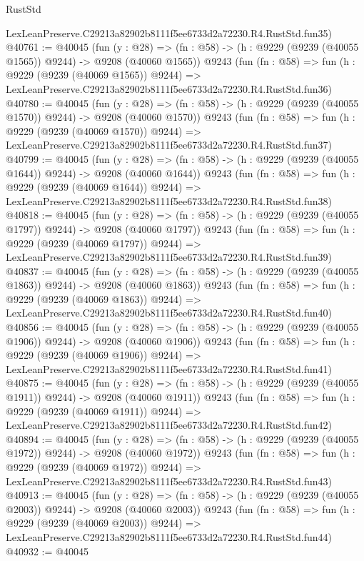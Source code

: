 \begin{lexlean}{RustStd}
\begin{coremodule}
    LexLeanPreserve.C29213a82902b8111f5ee6733d2a72230.R4.RustStd.fun35)
@40761 := @40045
    (fun (y : @28) =>
    (fn : @58) -> (h : @9229 (@9239 (@40055 @1565)) @9244) -> @9208 (@40060 @1565))
    @9243
    (fun (fn : @58) =>
    fun (h : @9229 (@9239 (@40069 @1565)) @9244) =>
    LexLeanPreserve.C29213a82902b8111f5ee6733d2a72230.R4.RustStd.fun36)
@40780 := @40045
    (fun (y : @28) =>
    (fn : @58) -> (h : @9229 (@9239 (@40055 @1570)) @9244) -> @9208 (@40060 @1570))
    @9243
    (fun (fn : @58) =>
    fun (h : @9229 (@9239 (@40069 @1570)) @9244) =>
    LexLeanPreserve.C29213a82902b8111f5ee6733d2a72230.R4.RustStd.fun37)
@40799 := @40045
    (fun (y : @28) =>
    (fn : @58) -> (h : @9229 (@9239 (@40055 @1644)) @9244) -> @9208 (@40060 @1644))
    @9243
    (fun (fn : @58) =>
    fun (h : @9229 (@9239 (@40069 @1644)) @9244) =>
    LexLeanPreserve.C29213a82902b8111f5ee6733d2a72230.R4.RustStd.fun38)
@40818 := @40045
    (fun (y : @28) =>
    (fn : @58) -> (h : @9229 (@9239 (@40055 @1797)) @9244) -> @9208 (@40060 @1797))
    @9243
    (fun (fn : @58) =>
    fun (h : @9229 (@9239 (@40069 @1797)) @9244) =>
    LexLeanPreserve.C29213a82902b8111f5ee6733d2a72230.R4.RustStd.fun39)
@40837 := @40045
    (fun (y : @28) =>
    (fn : @58) -> (h : @9229 (@9239 (@40055 @1863)) @9244) -> @9208 (@40060 @1863))
    @9243
    (fun (fn : @58) =>
    fun (h : @9229 (@9239 (@40069 @1863)) @9244) =>
    LexLeanPreserve.C29213a82902b8111f5ee6733d2a72230.R4.RustStd.fun40)
@40856 := @40045
    (fun (y : @28) =>
    (fn : @58) -> (h : @9229 (@9239 (@40055 @1906)) @9244) -> @9208 (@40060 @1906))
    @9243
    (fun (fn : @58) =>
    fun (h : @9229 (@9239 (@40069 @1906)) @9244) =>
    LexLeanPreserve.C29213a82902b8111f5ee6733d2a72230.R4.RustStd.fun41)
@40875 := @40045
    (fun (y : @28) =>
    (fn : @58) -> (h : @9229 (@9239 (@40055 @1911)) @9244) -> @9208 (@40060 @1911))
    @9243
    (fun (fn : @58) =>
    fun (h : @9229 (@9239 (@40069 @1911)) @9244) =>
    LexLeanPreserve.C29213a82902b8111f5ee6733d2a72230.R4.RustStd.fun42)
@40894 := @40045
    (fun (y : @28) =>
    (fn : @58) -> (h : @9229 (@9239 (@40055 @1972)) @9244) -> @9208 (@40060 @1972))
    @9243
    (fun (fn : @58) =>
    fun (h : @9229 (@9239 (@40069 @1972)) @9244) =>
    LexLeanPreserve.C29213a82902b8111f5ee6733d2a72230.R4.RustStd.fun43)
@40913 := @40045
    (fun (y : @28) =>
    (fn : @58) -> (h : @9229 (@9239 (@40055 @2003)) @9244) -> @9208 (@40060 @2003))
    @9243
    (fun (fn : @58) =>
    fun (h : @9229 (@9239 (@40069 @2003)) @9244) =>
    LexLeanPreserve.C29213a82902b8111f5ee6733d2a72230.R4.RustStd.fun44)
@40932 := @40045

\end{coremodule}
\end{lexlean}
